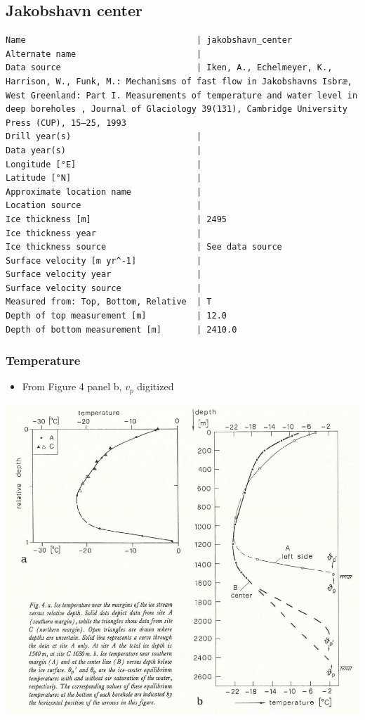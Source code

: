 \documentclass[article,a4paper,times,11pt,twoside]{article}
\begin{document}
\subsection{Jakobshavn center}
\label{sec:org1b0df51}
\begin{verbatim}
Name                                  | jakobshavn_center
Alternate name                        | 
Data source                           | Iken, A., Echelmeyer, Κ., Harrison, W., Funk, M.: Mechanisms of fast flow in Jakobshavns Isbræ, West Greenland: Part I. Measurements of temperature and water level in deep boreholes , Journal of Glaciology 39(131), Cambridge University Press (CUP), 15–25, 1993 
Drill year(s)                         | 
Data year(s)                          | 
Longitude [°E]                        | 
Latitude [°N]                         | 
Approximate location name             | 
Location source                       | 
Ice thickness [m]                     | 2495
Ice thickness year                    | 
Ice thickness source                  | See data source
Surface velocity [m yr^-1]            | 
Surface velocity year                 | 
Surface velocity source               | 
Measured from: Top, Bottom, Relative  | T
Depth of top measurement [m]          | 12.0
Depth of bottom measurement [m]       | 2410.0
\end{verbatim}

\subsubsection{Temperature}
\label{sec:orgf028e90}

\begin{itemize}
\item From \textcite{iken_1993} Figure 4 panel b, \(v_p\) digitized
\end{itemize}

\begin{center}
\includegraphics[width=.9\linewidth]{jakobshavn_center/iken_1993_fig4.png}
\end{center}
\end{document}
